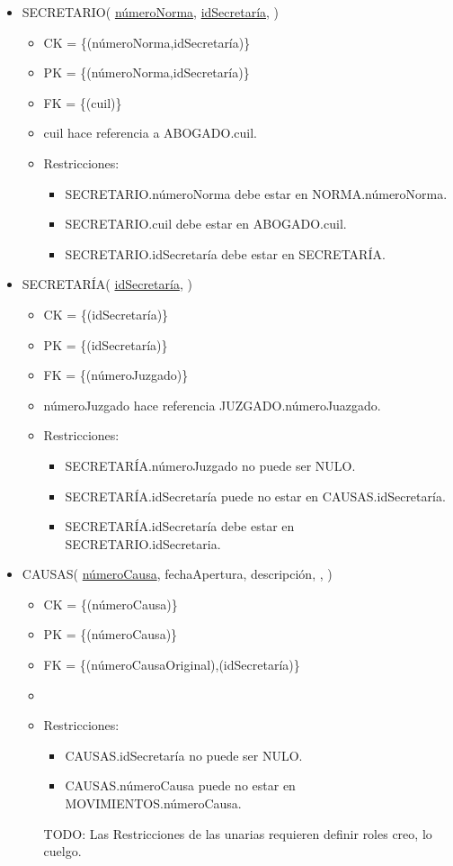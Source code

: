 \begin{itemize}
	
\item SECRETARIO( \underline{númeroNorma}, \underline{idSecretaría}, )
	\begin{itemize}
		\item CK = \{(númeroNorma,idSecretaría)\}
		\item PK = \{(númeroNorma,idSecretaría)\}
		\item FK = \{(cuil)\}
		\item cuil hace referencia a ABOGADO.cuil.
		\item Restricciones:
			\begin{itemize}
			\item SECRETARIO.númeroNorma debe estar en NORMA.númeroNorma.
			\item SECRETARIO.cuil debe estar en ABOGADO.cuil.
			\item SECRETARIO.idSecretaría debe estar en SECRETARÍA.
			\\
			\end{itemize}
	\end{itemize}


\item SECRETARÍA( \underline{idSecretaría}, )
	\begin{itemize}
		\item CK = \{(idSecretaría)\}
		\item PK = \{(idSecretaría)\}
		\item FK = \{(númeroJuzgado)\}
		\item númeroJuzgado hace referencia JUZGADO.númeroJuazgado.
		\item Restricciones:
			\begin{itemize}
			\item SECRETARÍA.númeroJuzgado no puede ser NULO.
			\item SECRETARÍA.idSecretaría puede no estar en CAUSAS.idSecretaría.
			\item SECRETARÍA.idSecretaría debe estar en SECRETARIO.idSecretaria.
			\\
			\end{itemize}
	\end{itemize}

	
\item CAUSAS( \underline{númeroCausa}, fechaApertura, descripción, , )
	\begin{itemize}
		\item CK = \{(númeroCausa)\}
		\item PK = \{(númeroCausa)\}
		\item FK = \{(númeroCausaOriginal),(idSecretaría)\}
		\item 
		\item Restricciones:
			\begin{itemize}
			\item CAUSAS.idSecretaría no puede ser NULO.
			\item CAUSAS.númeroCausa puede no estar en MOVIMIENTOS.númeroCausa.
			\\
			\end{itemize}
			TODO: Las Restricciones de las unarias requieren definir roles creo, lo cuelgo.
	\end{itemize}


\end{itemize}
